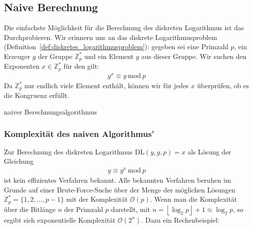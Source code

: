 \documentclass[
  a4paper,
  11pt,
]{scrartcl}
\theoremstyle{plain}
\theoremstyle{definition}
\theoremstyle{remark}
\newcommand{\Z}{\mathbb{Z}}
\renewcommand{\P}{\mathbb{P}}
\newcommand{\Mod}[1]{\ \mathrm{mod}\ #1}
\begin{document}
\subsection{Naive Berechnung}
\label{sub:naive_berechnung}

Die einfachste Möglichkeit für die Berechnung des diskreten Logarithmus ist das
Durchprobieren. Wir erinnern uns an das diskrete Logarithmusproblem
(Definition~\ref{def:diskretes_logarithmusproblem}): gegeben sei eine Primzahl
$p$, ein Erzeuger $g$ der Gruppe $\Z_p^*$ und ein Element $y$ aus dieser Gruppe.
Wir suchen den Exponenten $x \in \Z_p^*$ für den gilt:
\begin{align*}
  g^x \equiv y \Mod{p}
\end{align*}
Da $\Z_p^*$ nur endlich viele Element enthält, können wir für jedes $x$
überprüfen, ob es die Kongruenz erfüllt.

\begin{algorithm}[H]\label{alg:dlog_naive}
  \caption{naiver Berechnungsalgorithmus}
  \begin{algorithmic}
    \REQUIRE{$p \in \P, \left\langle g \right\rangle \in \Z_p^*, y \in \Z_p^*$}
      \IF{$g^x \equiv y \Mod{p}$}
      \ELSE{}
      \ENDIF{}
    \ENDFOR{}
  \end{algorithmic}
\end{algorithm}

\subsubsection{Komplexität des naiven Algorithmus’}
\label{ssub:komplexitaet_naiver_algorithmus}

Zur Berechnung des diskreten Logarithmus $\text{DL}(y,g,p) = x$ als Lösung der
Gleichung
\begin{align*}
  y \equiv g^x \Mod{p}
\end{align*}
ist kein effizientes Verfahren bekannt.
Alle bekannten Verfahren beruhen im Grunde auf einer Brute-Force-Suche über der
Menge der möglichen Lösungen $\Z_p^* = \{1, 2, \ldots, p-1\}$ mit der
Komplexität $\mathcal{O}(p)$.
Wenn man die Komplexität über die Bitlänge $n$ der Primzahl $p$ darstellt, mit
$n = \left\lfloor \log_2 p \right\rfloor + 1 \approx \log_2 p$, so ergibt sich
exponentielle Komplexität $\mathcal{O}(2^n)$. Dazu ein Rechenbeispiel:
\end{document}

